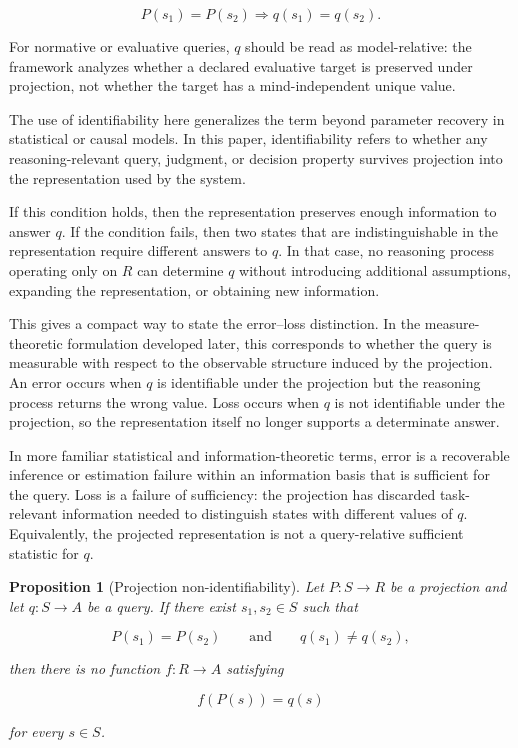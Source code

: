 \documentclass[11pt]{article}
\newtheorem{proposition}{Proposition}[section]
\theoremstyle{definition}
\theoremstyle{remark}
\begin{document}
\[
P(s_1)=P(s_2) \Rightarrow q(s_1)=q(s_2).
\]

For normative or evaluative queries, \(q\) should be read as model-relative: the framework analyzes whether a declared evaluative target is preserved under projection, not whether the target has a mind-independent unique value.

The use of identifiability here generalizes the term beyond parameter recovery in statistical or causal models. In this paper, identifiability refers to whether any reasoning-relevant query, judgment, or decision property survives projection into the representation used by the system.

If this condition holds, then the representation preserves enough information to answer $q$. If the condition fails, then two states that are indistinguishable in the representation require different answers to $q$. In that case, no reasoning process operating only on $R$ can determine $q$ without introducing additional assumptions, expanding the representation, or obtaining new information.

This gives a compact way to state the error--loss distinction. In the measure-theoretic formulation developed later, this corresponds to whether the query is measurable with respect to the observable structure induced by the projection. An error occurs when $q$ is identifiable under the projection but the reasoning process returns the wrong value. Loss occurs when $q$ is not identifiable under the projection, so the representation itself no longer supports a determinate answer.

In more familiar statistical and information-theoretic terms, error is a recoverable inference or estimation failure within an information basis that is sufficient for the query. Loss is a failure of sufficiency: the projection has discarded task-relevant information needed to distinguish states with different values of $q$. Equivalently, the projected representation is not a query-relative sufficient statistic for $q$.

\begin{proposition}[Projection non-identifiability]
\label{prop:projection-nonidentifiability}
Let \(P:S\rightarrow R\) be a projection and let \(q:S\rightarrow A\) be a query. If there exist \(s_1,s_2\in S\) such that

\[
P(s_1)=P(s_2)
\qquad\text{and}\qquad
q(s_1)\neq q(s_2),
\]

then there is no function \(f:R\rightarrow A\) satisfying

\[
f(P(s))=q(s)
\]

for every \(s\in S\).
\end{proposition}
\end{document}

